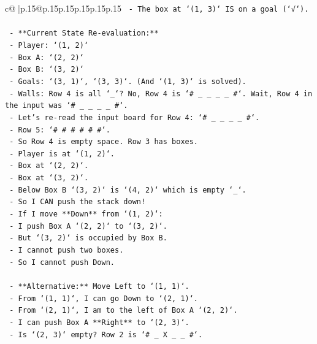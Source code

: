 \documentclass{article}
\begin{document}
{\begin{supertabular}{c@{$\;$}|p{.15\linewidth}@{}p{.15\linewidth}p{.15\linewidth}p{.15\linewidth}p{.15\linewidth}p{.15\linewidth}}
{{{\texttt{        {-} The box at `(1, 3)` IS on a goal (`√`).} \\
\\ 
\texttt{    {-} **Current State Re{-}evaluation:**} \\
\texttt{        {-} Player: `(1, 2)`} \\
\texttt{        {-} Box A: `(2, 2)`} \\
\texttt{        {-} Box B: `(3, 2)`} \\
\texttt{        {-} Goals: `(3, 1)`, `(3, 3)`. (And `(1, 3)` is solved).} \\
\texttt{        {-} Walls: Row 4 is all `\_`? No, Row 4 is `\# \_ \_ \_ \_ \#`. Wait, Row 4 in the input was `\# \_ \_ \_ \_ \#`.} \\
\texttt{        {-} Let's re{-}read the input board for Row 4: `\# \_ \_ \_ \_ \#`.} \\
\texttt{        {-} Row 5: `\# \# \# \# \# \#`.} \\
\texttt{        {-} So Row 4 is empty space. Row 3 has boxes.} \\
\texttt{        {-} Player is at `(1, 2)`.} \\
\texttt{        {-} Box at `(2, 2)`.} \\
\texttt{        {-} Box at `(3, 2)`.} \\
\texttt{        {-} Below Box B `(3, 2)` is `(4, 2)` which is empty `\_`.} \\
\texttt{        {-} So I CAN push the stack down!} \\
\texttt{        {-} If I move **Down** from `(1, 2)`:} \\
\texttt{            {-} I push Box A `(2, 2)` to `(3, 2)`.} \\
\texttt{            {-} But `(3, 2)` is occupied by Box B.} \\
\texttt{            {-} I cannot push two boxes.} \\
\texttt{        {-} So I cannot push Down.} \\
\\ 
\texttt{    {-} **Alternative:** Move Left to `(1, 1)`.} \\
\texttt{        {-} From `(1, 1)`, I can go Down to `(2, 1)`.} \\
\texttt{        {-} From `(2, 1)`, I am to the left of Box A `(2, 2)`.} \\
\texttt{        {-} I can push Box A **Right** to `(2, 3)`.} \\
\texttt{        {-} Is `(2, 3)` empty? Row 2 is `\# \_ X \_ \_ \#`.} \\
}}}
\end{supertabular}}
\end{document}
